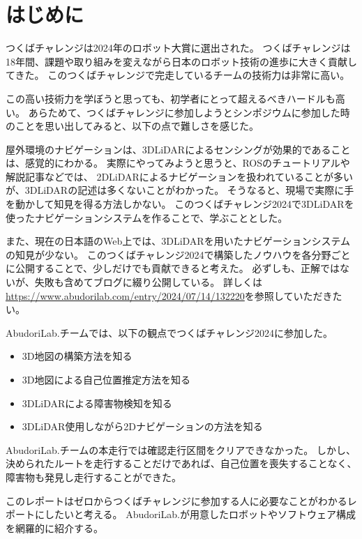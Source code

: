 \section{はじめに}
つくばチャレンジは2024年のロボット大賞に選出\cite{tsukuba}された。
つくばチャレンジは18年間、課題や取り組みを変えながら日本のロボット技術の進歩に大きく貢献してきた。
このつくばチャレンジで完走しているチームの技術力は非常に高い。

この高い技術力を学ぼうと思っても、初学者にとって超えるべきハードルも高い。
あらためて、つくばチャレンジに参加しようとシンポジウムに参加した時のことを思い出してみると、以下の点で難しさを感じた。

屋外環境のナビゲーションは、3DLiDARによるセンシングが効果的であることは、感覚的にわかる。
実際にやってみようと思うと、ROSのチュートリアルや解説記事などでは、
2DLiDARによるナビゲーションを扱われていることが多いが、3DLiDARの記述は多くないことがわかった。
そうなると、現場で実際に手を動かして知見を得る方法しかない。
このつくばチャレンジ2024で3DLiDARを使ったナビゲーションシステムを作ることで、学ぶこととした。

また、現在の日本語のWeb上では、3DLiDARを用いたナビゲーションシステムの知見が少ない。
このつくばチャレンジ2024で構築したノウハウを各分野ごとに公開することで、少しだけでも貢献できると考えた。
必ずしも、正解ではないが、失敗も含めてブログに綴り公開している。
詳しくは\url{https://www.abudorilab.com/entry/2024/07/14/132220}を参照していただきたい。


AbudoriLab.チームでは、以下の観点でつくばチャレンジ2024に参加した。
\begin{itemize}
    \item 3D地図の構築方法を知る
    \item 3D地図による自己位置推定方法を知る
    \item 3DLiDARによる障害物検知を知る
    \item 3DLiDAR使用しながら2Dナビゲーションの方法を知る
\end{itemize}

AbudoriLab.チームの本走行では確認走行区間をクリアできなかった。
しかし、決められたルートを走行することだけであれば、自己位置を喪失することなく、障害物も発見し走行することができた。

このレポートはゼロからつくばチャレンジに参加する人に必要なことがわかるレポートにしたいと考える。
AbudoriLab.が用意したロボットやソフトウェア構成を網羅的に紹介する。